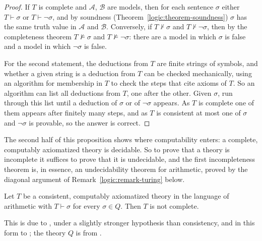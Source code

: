 \begin{proof}
If $T$ is complete and $\mathcal{A}$, $\mathcal{B}$ are models, then for each sentence $\sigma$ either $T \vdash \sigma$ or $T \vdash \neg\sigma$, and by soundness
(Theorem~\ref{logic:theorem-soundness}) $\sigma$ has the same truth value in $\mathcal{A}$ and $\mathcal{B}$. Conversely, if $T \not\vdash \sigma$ and $T \not\vdash \neg\sigma$, then by the
completeness theorem $T \not\models \sigma$ and $T \not\models \neg\sigma$: there are a model in which $\sigma$ is false and a model in which $\neg\sigma$ is false.

For the second statement, the deductions from $T$ are finite strings of symbols, and whether a given string is a deduction from $T$ can be checked mechanically, using an algorithm
for membership in $T$ to check the steps that cite axioms of $T$. So an algorithm can list all deductions from $T$, one after the other. Given $\sigma$, run through this list until a
deduction of $\sigma$ or of $\neg\sigma$ appears. As $T$ is complete one of them appears after finitely many steps, and as $T$ is consistent at most one of $\sigma$ and $\neg\sigma$ is
provable, so the answer is correct.
\end{proof}

The second half of this proposition shows where computability enters: a complete, computably axiomatized theory is decidable. So to prove that a theory is incomplete it
suffices to prove that it is undecidable, and the first incompleteness theorem is, in essence, an undecidability theorem for arithmetic, proved by the diagonal argument of
Remark~\ref{logic:remark-turing} below.

\begin{theorem}\label{logic:theorem-first-incompleteness}
Let $T$ be a consistent, computably axiomatized theory in the language of
arithmetic with $T \vdash \sigma$ for every $\sigma \in Q$. Then $T$ is not
complete.
\end{theorem}

This is due to \cite{godel-1931}, under a slightly stronger hypothesis than
consistency, and in this form to \cite{rosser-1936}; the theory $Q$ is from
\cite{tarski-mostowski-robinson}.

